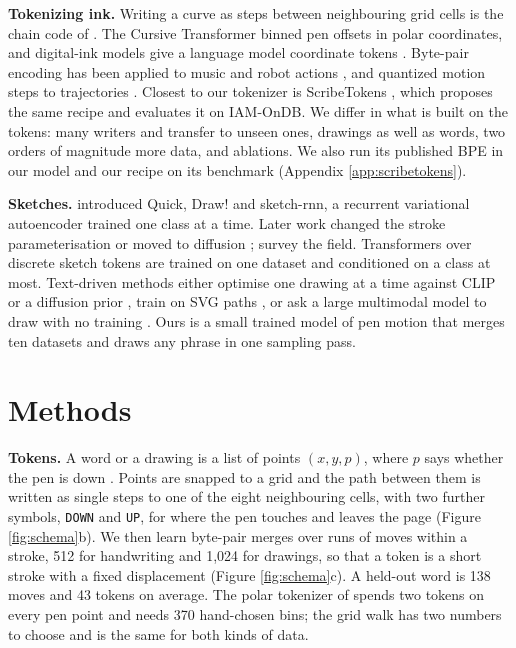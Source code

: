 \documentclass{article}
\begin{document}
\textbf{Tokenizing ink.} Writing a curve as steps between neighbouring grid cells is the chain code of \citet{freeman1961encoding}. The Cursive Transformer \citep{greydanus2025cursive} binned pen offsets in polar coordinates, and digital-ink models give a language model coordinate tokens \citep{fadeeva2024representing,mitrevski2024inksight}. Byte-pair encoding has been applied to music \citep{fradet2023byte} and robot actions \citep{pertsch2025fast}, and quantized motion steps to trajectories \citep{seff2023motionlm,philion2024trajeglish}. Closest to our tokenizer is ScribeTokens \citep{wang2026scribetokens}, which proposes the same recipe and evaluates it on IAM-OnDB. We differ in what is built on the tokens: many writers and transfer to unseen ones, drawings as well as words, two orders of magnitude more data, and ablations. We also run its published BPE in our model and our recipe on its benchmark (Appendix \ref{app:scribetokens}).

\textbf{Sketches.} \citet{ha2018neural} introduced Quick, Draw! and sketch-rnn, a recurrent variational autoencoder trained one class at a time. Later work changed the stroke parameterisation \citep{das2020beziersketch,aksan2020cose} or moved to diffusion \citep{wang2023sketchknitter,das2023chirodiff}; \citet{xu2023deep} survey the field. Transformers over discrete sketch tokens \citep{ribeiro2020sketchformer,tiwari2024sketchgpt,wang2025vq} are trained on one dataset and conditioned on a class at most. Text-driven methods either optimise one drawing at a time against CLIP or a diffusion prior \citep{li2020differentiable,frans2022clipdraw,vinker2022clipasso,jain2023vectorfusion,xing2023diffsketcher}, train on SVG paths \citep{carlier2020deepsvg,wu2023iconshop,tang2024strokenuwa,rodriguez2025starvector,yang2025omnisvg}, or ask a large multimodal model to draw with no training \citep{vinker2025sketchagent,sesay2026handwritingagent}. Ours is a small trained model of pen motion that merges ten datasets and draws any phrase in one sampling pass.

\section{Methods}

\textbf{Tokens.} A word or a drawing is a list of points $(x, y, p)$, where $p$ says whether the pen is down \citep{graves2014generating}. Points are snapped to a grid and the path between them is written as single steps to one of the eight neighbouring cells, with two further symbols, \texttt{DOWN} and \texttt{UP}, for where the pen touches and leaves the page (Figure \ref{fig:schema}b). We then learn byte-pair merges over runs of moves within a stroke, 512 for handwriting and 1,024 for drawings, so that a token is a short stroke with a fixed displacement (Figure \ref{fig:schema}c). A held-out word is 138 moves and 43 tokens on average. The polar tokenizer of \citet{greydanus2025cursive} spends two tokens on every pen point and needs 370 hand-chosen bins; the grid walk has two numbers to choose and is the same for both kinds of data.
\end{document}
